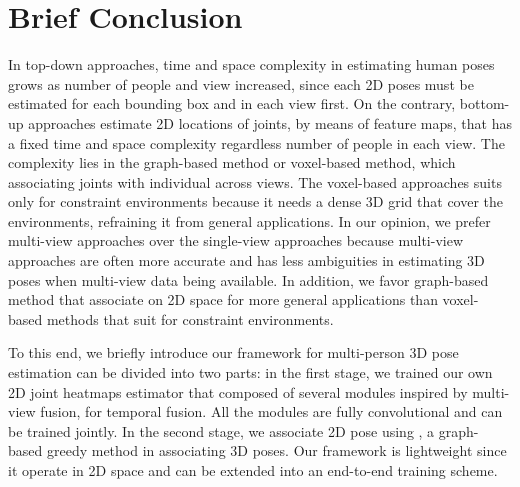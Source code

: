 \section{Brief Conclusion}
In top-down approaches, time and space complexity in estimating human poses grows as number of people and view increased, since each 2D poses must be estimated for each bounding box and in each view first. On the contrary, bottom-up approaches estimate 2D locations of joints, by means of feature maps, that has a fixed time and space complexity regardless number of people in each view. The complexity lies in the graph-based method or voxel-based method, which associating joints with individual across views. The voxel-based approaches suits only for constraint environments because it needs a dense 3D grid that cover the environments, refraining it from general applications. In our opinion, we prefer multi-view approaches over the single-view approaches because multi-view approaches are often more accurate and has less ambiguities in estimating 3D poses when multi-view data being available. In addition, we favor graph-based method that associate on 2D space for more general applications than voxel-based methods that suit for constraint environments.
 
To this end, we briefly introduce our framework for multi-person 3D pose estimation can be divided into two parts: in the first stage, we trained our own 2D joint heatmaps estimator that composed of several modules inspired by \cite{epipolartransformers, multiviewpose} multi-view fusion,  \cite{pavllo:videopose3d:2019} for temporal fusion. All the modules are fully convolutional and can be trained jointly. In the second stage, we associate 2D pose using \cite{tanke2019iterative}, a graph-based greedy method in associating 3D poses. Our framework is lightweight since it operate in 2D space and can be extended into an end-to-end training scheme.